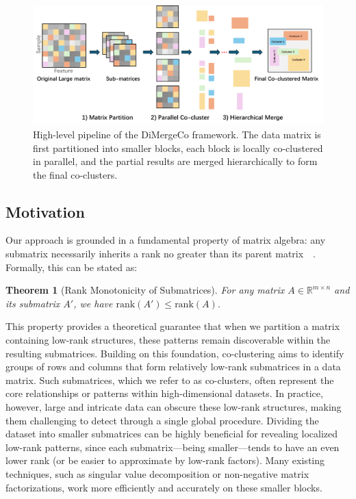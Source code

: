 \documentclass[journal]{IEEEtran}
\newtheorem{theorem}{Theorem}
\renewcommand{\cite}[1]{~\autocite{#1}}
\begin{document}
\begin{figure}[t]
    \centering
    \includegraphics[width=0.8\linewidth]{workflow.png} %
    \caption{High-level pipeline of the DiMergeCo framework. The data matrix is first partitioned into smaller blocks, each block is locally co-clustered in parallel, and the partial results are merged hierarchically to form the final co-clusters.}
    \label{fig:DiMergeCo_pipeline}
\end{figure}

\subsection{Motivation}
\label{subsec:motivation}

Our approach is grounded in a fundamental property of matrix algebra: any submatrix necessarily inherits a rank no greater than its parent matrix~\cite{horn1985MatrixAnalysis}. Formally, this can be stated as:

\begin{theorem}[Rank Monotonicity of Submatrices]
    \label{thm:rank_monotonicity}
    For any matrix $A \in \mathbb{R}^{m \times n}$ and its submatrix $A'$, we have $\text{rank}(A') \leq \text{rank}(A)$.
\end{theorem}

This property provides a theoretical guarantee that when we partition a matrix containing low-rank structures, these patterns remain discoverable within the resulting submatrices. Building on this foundation, co-clustering aims to identify groups of rows and columns that form relatively low-rank submatrices in a data matrix. Such submatrices, which we refer to as co-clusters, often represent the core relationships or patterns within high-dimensional datasets. In practice, however, large and intricate data can obscure these low-rank structures, making them challenging to detect through a single global procedure. Dividing the dataset into smaller submatrices can be highly beneficial for revealing localized low-rank patterns, since each submatrix—being smaller—tends to have an even lower rank (or be easier to approximate by low-rank factors). Many existing techniques, such as singular value decomposition or non-negative matrix factorizations, work more efficiently and accurately on these smaller blocks.
\end{document}
